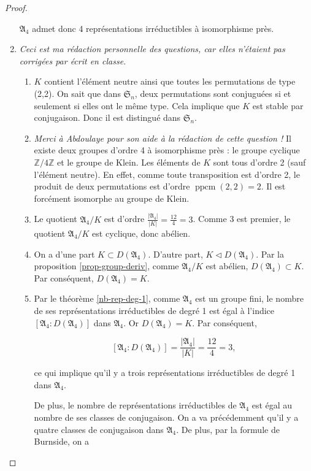 \documentclass[french]{book}
\theoremstyle{definition}
\theoremstyle{remark}
\begin{document}
\begin{proof}
\begin{enumerate}
    \(\mathfrak{A}_4\) admet donc 4 représentations irréductibles à isomorphisme près.

    \item \emph{Ceci est ma rédaction personnelle des questions, car elles n'étaient pas corrigées par écrit en classe.}

    \begin{enumerate}
      \item \(K\) contient l'élément neutre ainsi que toutes les permutations de type (2,2). On sait que dans \(\mathfrak{S}_n\), deux permutations sont conjuguées si et seulement si elles ont le même type. Cela implique que \(K\) est stable par conjugaison. Donc il est distingué dans \(\mathfrak{S}_n\).
      \item \emph{Merci à Abdoulaye pour son aide à la rédaction de cette question !} Il existe deux groupes d'ordre 4 à isomorphisme près : le groupe cyclique \(\mathbb{Z}/{4}\mathbb{Z}\) et le groupe de Klein. Les éléments de \(K\) sont tous d'ordre 2 (sauf l'élément neutre). En effet, comme toute transposition est d'ordre 2, le produit de deux permutations est d'ordre \(\operatorname{ppcm}(2,2) = 2\). Il est forcément isomorphe au groupe de Klein.
      \item Le quotient \(\mathfrak{A}_4 / K\) est d'ordre \(\frac{\left\lvert \mathfrak{A}_4 \right\rvert}{\left\lvert K \right\rvert} = \frac{12}{4}=3\). Comme 3 est premier, le quotient \(\mathfrak{A}_4 / K\) est cyclique, donc abélien.
      \item On a d'une part \(K \subset D(\mathfrak{A}_4)\). D'autre part, \(K \triangleleft D(\mathfrak{A}_4)\). Par la proposition \ref{prop-group-deriv}, comme \(\mathfrak{A}_4 / K\) est abélien, \(D(\mathfrak{A}_4) \subset K\). Par conséquent, \(D(\mathfrak{A}_4) = K\).
      \item Par le théorème \ref{nb-rep-deg-1}, comme \(\mathfrak{A}_4\) est un groupe fini, le nombre de ses représentations irréductibles de degré 1 est égal à l'indice \([\mathfrak{A}_4 : D(\mathfrak{A}_4)]\) dans \(\mathfrak{A}_4\). Or \(D(\mathfrak{A}_4) = K\). Par conséquent,

      \[[\mathfrak{A}_4 : D(\mathfrak{A}_4)] = \frac{\left\lvert \mathfrak{A}_4 \right\rvert}{\left\lvert K \right\rvert} = \frac{12}{4} = 3,\]

      ce qui implique qu'il y a trois représentations irréductibles de degré 1 dans \(\mathfrak{A}_4\).

      De plus, le nombre de représentations irréductibles de \(\mathfrak{A}_4\) est égal au nombre de ses classes de conjugaison. On a va précédemment qu'il y a quatre classes de conjugaison dans \(\mathfrak{A}_4\). De plus, par la formule de Burnside, on a


\end{enumerate}
\end{enumerate}
\end{proof}
\end{document}
